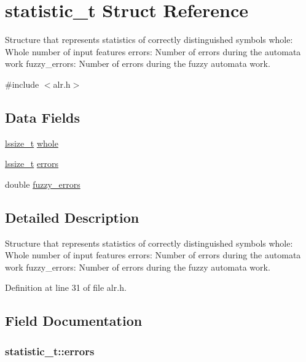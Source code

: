 \hypertarget{structstatistic__t}{\section{statistic\-\_\-t Struct Reference}
\label{structstatistic__t}
}


Structure that represents statistics of correctly distinguished symbols whole\-: Whole number of input features errors\-: Number of errors during the automata work fuzzy\-\_\-errors\-: Number of errors during the fuzzy automata work.  




{\ttfamily \#include $<$alr.\-h$>$}

\subsection*{Data Fields}
\begin{DoxyCompactItemize}
\item 
\hyperlink{types_8h_a7d26c4b79dd442ab669f42f4415ceea0}{lssize\-\_\-t} \hyperlink{structstatistic__t_adbfaa1250ca1aa99329370593f10d513}{whole}
\item 
\hyperlink{types_8h_a7d26c4b79dd442ab669f42f4415ceea0}{lssize\-\_\-t} \hyperlink{structstatistic__t_ac680f2518e77d0f715617b136c700cbe}{errors}
\item 
double \hyperlink{structstatistic__t_a725e02cd58507b86811bd8d43ae61085}{fuzzy\-\_\-errors}
\end{DoxyCompactItemize}


\subsection{Detailed Description}
Structure that represents statistics of correctly distinguished symbols whole\-: Whole number of input features errors\-: Number of errors during the automata work fuzzy\-\_\-errors\-: Number of errors during the fuzzy automata work. 

Definition at line 31 of file alr.\-h.



\subsection{Field Documentation}
\hypertarget{structstatistic__t_ac680f2518e77d0f715617b136c700cbe}{
\subsubsection[{errors}]{ statistic\-\_\-t\-::errors}}\label{structstatistic__t_ac680f2518e77d0f715617b136c700cbe}


